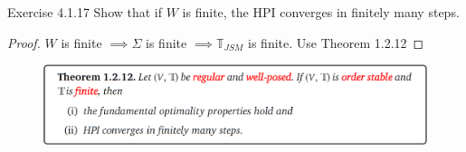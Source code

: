 \begin{frame}{Exercise 4.1.17}
    Show that if $W$ is finite, the HPI converges in finitely many steps.
    \begin{proof}
        $W$ is finite $\implies \Sigma$ is finite $\implies \mathbb{T}_{JSM}$ is finite. Use Theorem 1.2.12
    \end{proof}
    \begin{figure}
        \centering
        \includegraphics[width=1\linewidth]{Dynamic Programming/DP2/Chapter 4/Section 4.1.1. Job Search/thm1212.png}
    \end{figure}
\end{frame}